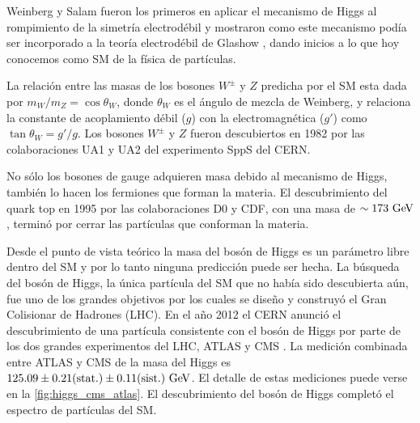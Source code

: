 Weinberg y Salam fueron los primeros en aplicar el mecanismo de Higgs al
rompimiento de la simetría electrodébil
\cite{PhysRevLett.19.1264,PhysRev.127.965} y mostraron como este mecanismo podía
ser incorporado a la teoría electrodébil de Glashow \cite{Glashow1961579}, dando
inicios a lo que hoy conocemos como SM de la física de partículas.

La relación entre las masas de los bosones $W^\pm$ y $Z$ predicha por el SM esta
dada por $m_W/m_Z = \cos \theta_W$, donde $\theta_W$ es el ángulo de
mezcla de Weinberg, y relaciona la constante de acoplamiento débil ($g$) con la
electromagnética ($g'$) como $\tan\theta_W = g'/g$. Los bosones $W^\pm$ y $Z$
fueron descubiertos en 1982 por las colaboraciones UA1 y UA2 del experimento
SppS del CERN.

No sólo los bosones de gauge adquieren masa debido al mecanismo de Higgs,
también lo hacen los fermiones que forman la materia. El descubrimiento del
quark top en 1995 por las colaboraciones D0 y CDF, con una masa de $\sim 173
\GeV$, terminó por cerrar las partículas que conforman la materia.

Desde el punto de vista teórico la masa del bosón de Higgs es un parámetro libre
dentro del SM y por lo tanto ninguna predicción puede ser hecha. La búsqueda
del bosón de Higgs, la única partícula del SM que no había sido descubierta
aún, fue uno de los grandes objetivos por los cuales se dise\~no y construyó el
Gran Colisionar de Hadrones (LHC). En el a\~no 2012 el CERN anunció el
descubrimiento de una partícula consistente con el bosón de Higgs por parte de
los dos grandes experimentos del LHC, ATLAS y CMS
\cite{Aad:2012tfa,Chatrchyan:2012ufa}. La medición combinada entre ATLAS y CMS
de la masa del Higgs es $125.09 \pm 0.21 \text{(stat.)} \pm 0.11 \text{(sist.)}
\gev$\cite{HiggsMass_ATLAS_CMS}.
El detalle de estas mediciones  puede verse en la \cref{fig:higgs_cms_atlas}.
El descubrimiento del bosón de Higgs completó el espectro de partículas del SM.

